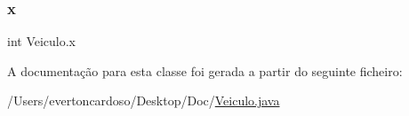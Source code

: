 \subsubsection{\texorpdfstring{x}{x}}
{\footnotesize\ttfamily int Veiculo.\+x\hspace{0.3cm}{\ttfamily [protected]}}



A documentação para esta classe foi gerada a partir do seguinte ficheiro\+:\begin{DoxyCompactItemize}
\item 
/\+Users/evertoncardoso/\+Desktop/\+Doc/\mbox{\hyperlink{_veiculo_8java}{Veiculo.\+java}}\end{DoxyCompactItemize}
